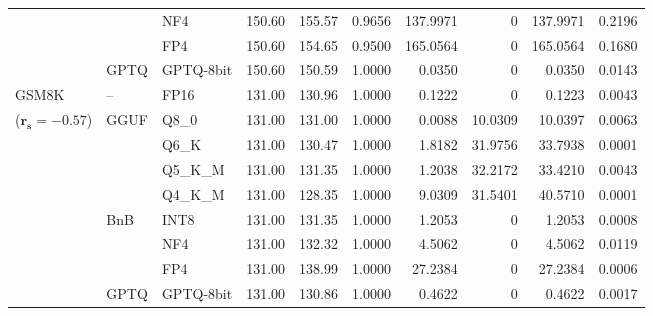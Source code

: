 \begin{longtable}{ll l rrrrrrr}
 &  & NF4 & 150.60 & 155.57 & 0.9656 & 137.9971 & \cellcolor{cyan!12} $0$ & 137.9971 & 0.2196 \\
 &  & FP4 & 150.60 & 154.65 & 0.9500 & 165.0564 & \cellcolor{cyan!12} $0$ & 165.0564 & 0.1680 \\
 & GPTQ & GPTQ-8bit & 150.60 & 150.59 & 1.0000 & 0.0350 & \cellcolor{cyan!12} $0$ & 0.0350 & 0.0143 \\
\midrule
GSM8K & -- & FP16 & 131.00 & 130.96 & 1.0000 & 0.1222 & \cellcolor{cyan!12} $0$ & 0.1223 & 0.0043 \\
{\small ($\mathbf{r_s{=}-0.57}$)} & GGUF & Q8\_0 & 131.00 & 131.00 & 1.0000 & 0.0088 & 10.0309 & 10.0397 & 0.0063 \\
 &  & Q6\_K & 131.00 & 130.47 & 1.0000 & 1.8182 & 31.9756 & 33.7938 & 0.0001 \\
 &  & Q5\_K\_M & 131.00 & 131.35 & 1.0000 & 1.2038 & 32.2172 & 33.4210 & 0.0043 \\
 &  & Q4\_K\_M & 131.00 & 128.35 & 1.0000 & 9.0309 & 31.5401 & 40.5710 & 0.0001 \\
 & BnB & INT8 & 131.00 & 131.35 & 1.0000 & 1.2053 & \cellcolor{cyan!12} $0$ & 1.2053 & 0.0008 \\
 &  & NF4 & 131.00 & 132.32 & 1.0000 & 4.5062 & \cellcolor{cyan!12} $0$ & 4.5062 & 0.0119 \\
 &  & FP4 & 131.00 & 138.99 & 1.0000 & 27.2384 & \cellcolor{cyan!12} $0$ & 27.2384 & 0.0006 \\
 & GPTQ & GPTQ-8bit & 131.00 & 130.86 & 1.0000 & 0.4622 & \cellcolor{cyan!12} $0$ & 0.4622 & 0.0017 \\
\end{longtable}
\endgroup